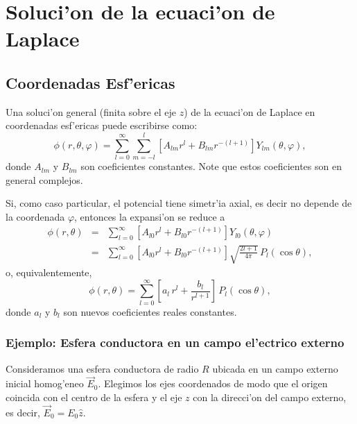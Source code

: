 \section{Soluci'on de la ecuaci'on de Laplace}
\subsection{Coordenadas Esf'ericas}
Una soluci'on general (finita sobre el eje $z$) de la ecuaci'on de Laplace en coordenadas esf'ericas puede escribirse como:
\begin{equation}
  \boxed{\phi(r,\theta,\varphi) = \sum_{l=0}^\infty\sum_{m=-l}^l\left[
  A_{lm}  r^l + B_{lm}  r^{-(l+1)}\right]  Y_{lm}(\theta,\varphi),}
  \label{est31b}
\end{equation}
donde $A_{lm}$ y $B_{lm}$ son coeficientes constantes. Note que estos
coeficientes son en general complejos.

Si, como caso particular, el potencial tiene simetr'ia axial, es decir no
depende de la coordenada $\varphi$, entonces la expansi'on se reduce a
\begin{eqnarray}
  \phi(r,\theta) &=& \sum_{l=0}^\infty\left[
  A_{l0}  r^l + B_{l0}  r^{-(l+1)}\right]  Y_{l0}(\theta,\varphi) \\
&=&\sum_{l=0}^\infty\left[  A_{l0}  r^l + B_{l0}
r^{-(l+1)}\right]\sqrt{\frac{2l+1}{4\pi}}\,P_l(\cos\theta) ,
\end{eqnarray}
o, equivalentemente,
\begin{equation}\label{phiaxial}
\boxed{\phi(r,\theta)=\sum_{l=0}^\infty\left[  a_l\,  r^l +
\frac{b_l}{r^{l+1}}\right]\,P_l(\cos\theta),}
\end{equation}
donde $a_l$ y $b_l$ son nuevos coeficientes reales constantes.

\subsubsection{Ejemplo: Esfera conductora en un campo el'ectrico externo}\label{sec:esfcond}

Consideramos una esfera conductora de radio $R$ ubicada en un campo externo inicial homog'eneo $\vec{E}_0$. Elegimos los ejes coordenados de modo que el origen coincida con el centro de la esfera y el eje $z$ con la direcci'on del campo externo, es decir, $\vec{E}_0=E_0\hat{z}$.

